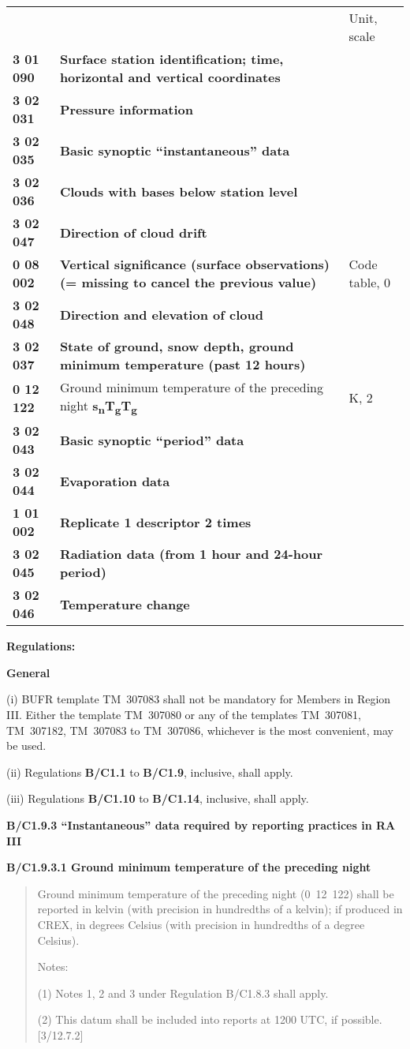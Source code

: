 \begin{longtable}[]{@{}lll@{}}
\toprule
\endhead
& & Unit, scale\tabularnewline
\textbf{3 01 090} & \textbf{Surface station identification; time, horizontal and vertical coordinates} &\tabularnewline
\textbf{3 02 031} & \textbf{Pressure information} &\tabularnewline
\textbf{3 02 035} & \textbf{Basic synoptic ``instantaneous'' data} &\tabularnewline
\textbf{3 02 036} & \textbf{Clouds with bases below station level} &\tabularnewline
\textbf{3 02 047} & \textbf{Direction of cloud drift} &\tabularnewline
\textbf{0 08 002} & \textbf{Vertical significance (surface observations) (= missing to cancel the previous value)} & Code table, 0\tabularnewline
\textbf{3 02 048} & \textbf{Direction and elevation of cloud} &\tabularnewline
\textbf{3 02 037} & \textbf{State of ground, snow depth, ground minimum temperature (past 12 hours)} &\tabularnewline
\textbf{0 12 122} & Ground minimum temperature of the preceding night \textbf{s\textsubscript{n}T\textsubscript{g}T\textsubscript{g}} & K, 2\tabularnewline
\textbf{3 02 043} & \textbf{Basic synoptic ``period'' data} &\tabularnewline
\textbf{3 02 044} & \textbf{Evaporation data} &\tabularnewline
\textbf{1 01 002} & \textbf{Replicate 1 descriptor 2 times} &\tabularnewline
\textbf{3 02 045} & \textbf{Radiation data (from 1 hour and 24-hour period)} &\tabularnewline
\textbf{3 02 046} & \textbf{Temperature change} &\tabularnewline
\bottomrule
\end{longtable}

\textbf{Regulations:}

\textbf{General}

(i) BUFR template TM~307083 shall not be mandatory for Members in Region III. Either the template TM~307080 or any of the templates TM~307081, TM~307182, TM~307083 to TM~307086, whichever is the most convenient, may be used.

(ii) Regulations \textbf{B/C1.1} to \textbf{B/C1.9}, inclusive, shall apply.

(iii) Regulations \textbf{B/C1.10} to \textbf{B/C1.14}, inclusive, shall apply.

\textbf{B/C1.9.3 ``Instantaneous'' data required by reporting practices in RA III}

\textbf{B/C1.9.3.1 Ground minimum temperature of the preceding night}

\begin{quote}
Ground minimum temperature of the preceding night (0~12~122) shall be reported in kelvin (with precision in hundredths of a kelvin); if produced in CREX, in degrees Celsius (with precision in hundredths of a degree Celsius).

Notes:

(1) Notes 1, 2 and 3 under Regulation B/C1.8.3 shall apply.

(2) This datum shall be included into reports at 1200 UTC, if possible. {[}3/12.7.2{]}
\end{quote}

